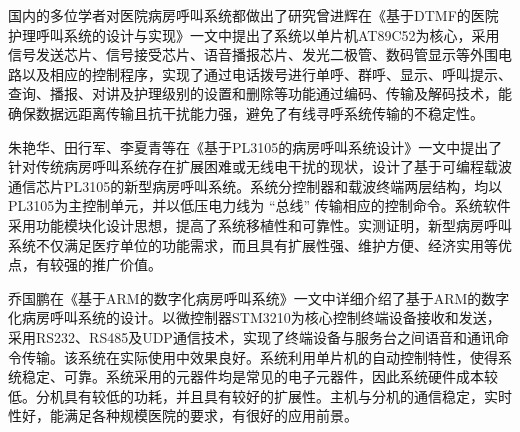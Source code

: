 国{\cf}内的{\cf}多位{\cf}学者{\cf}对医{\cf}院病{\cf}房呼{\cf}叫系{\cf}统都{\cf}做出{\cf}了研{\cf}究曾{\cf}进辉{\cf}在《{\cf}基于{\cf}DT{\cf}MF{\cf}的医{\cf}院护{\cf}理呼{\cf}叫系{\cf}统的{\cf}设计{\cf}与实{\cf}现》{\cf}一文{\cf}中提{\cf}出了{\cf}系统{\cf}以单{\cf}片机{\cf}AT{\cf}89{\cf}C5{\cf}2为{\cf}核心{\cf}，采{\cf}用信{\cf}号发{\cf}送芯{\cf}片、{\cf}信号{\cf}接受{\cf}芯片{\cf}、语{\cf}音播{\cf}报芯{\cf}片、{\cf}发光{\cf}二极{\cf}管、{\cf}数码{\cf}管显{\cf}示等{\cf}外围{\cf}电路{\cf}以及{\cf}相应{\cf}的控{\cf}制程{\cf}序，{\cf}实现{\cf}了通{\cf}过电{\cf}话拨{\cf}号进{\cf}行单{\cf}呼、{\cf}群呼{\cf}、显{\cf}示、{\cf}呼叫{\cf}提示{\cf}、查{\cf}询、{\cf}播报{\cf}、对{\cf}讲及{\cf}护理{\cf}级别{\cf}的设{\cf}置和{\cf}删除{\cf}等功{\cf}能通{\cf}过编{\cf}码、{\cf}传输{\cf}及解{\cf}码技{\cf}术，{\cf}能确{\cf}保数{\cf}据远{\cf}距离{\cf}传输{\cf}且抗{\cf}干扰{\cf}能力{\cf}强，{\cf}避免{\cf}了有{\cf}线寻{\cf}呼系{\cf}统传{\cf}输的{\cf}不稳{\cf}定性{\cf}。

朱{\cf}艳华{\cf}、田{\cf}行军{\cf}、李{\cf}夏青{\cf}等在{\cf}《基{\cf}于P{\cf}L3{\cf}10{\cf}5的{\cf}病房{\cf}呼叫{\cf}系统{\cf}设计{\cf}》一{\cf}文中{\cf}提出{\cf}了针{\cf}对传{\cf}统病{\cf}房呼{\cf}叫系{\cf}统存{\cf}在扩{\cf}展困{\cf}难或{\cf}无线{\cf}电干{\cf}扰的{\cf}现状{\cf}，设{\cf}计了{\cf}基于{\cf}可编{\cf}程载{\cf}波通{\cf}信芯{\cf}片P{\cf}L3{\cf}10{\cf}5的{\cf}新型{\cf}病房{\cf}呼叫{\cf}系统{\cf}。系{\cf}统分{\cf}控制{\cf}器和{\cf}载波{\cf}终端{\cf}两层{\cf}结构{\cf}，均{\cf}以P{\cf}L3{\cf}10{\cf}5为{\cf}主控{\cf}制单{\cf}元，{\cf}并以{\cf}低压{\cf}电力{\cf}线为{\cf} “总{\cf}线” {\cf}传输{\cf}相应{\cf}的控{\cf}制命{\cf}令。{\cf}系统{\cf}软件{\cf}采用{\cf}功能{\cf}模块{\cf}化设{\cf}计思{\cf}想，{\cf}提高{\cf}了系{\cf}统移{\cf}植性{\cf}和可{\cf}靠性{\cf}。实{\cf}测证{\cf}明，{\cf}新型{\cf}病房{\cf}呼叫{\cf}系统{\cf}不仅{\cf}满足{\cf}医疗{\cf}单位{\cf}的功{\cf}能需{\cf}求，{\cf}而且{\cf}具有{\cf}扩展{\cf}性强{\cf}、维{\cf}护方{\cf}便、{\cf}经济{\cf}实用{\cf}等优{\cf}点，{\cf}有较{\cf}强的{\cf}推广{\cf}价值{\cf}。

乔{\cf}国鹏{\cf}在《{\cf}基于{\cf}AR{\cf}M的{\cf}数字{\cf}化病{\cf}房呼{\cf}叫系{\cf}统》{\cf}一文{\cf}中详{\cf}细介{\cf}绍了{\cf}基于{\cf}AR{\cf}M的{\cf}数字{\cf}化病{\cf}房呼{\cf}叫系{\cf}统的{\cf}设计{\cf}。以{\cf}微控{\cf}制器{\cf}ST{\cf}M3{\cf}21{\cf}0为{\cf}核心{\cf}控制{\cf}终端{\cf}设备{\cf}接收{\cf}和发{\cf}送，{\cf}采用{\cf}RS{\cf}23{\cf}2、{\cf}RS{\cf}48{\cf}5及{\cf}UD{\cf}P通{\cf}信技{\cf}术，{\cf}实现{\cf}了终{\cf}端设{\cf}备与{\cf}服务{\cf}台之{\cf}间语{\cf}音和{\cf}通讯{\cf}命令{\cf}传输{\cf}。该{\cf}系统{\cf}在实{\cf}际使{\cf}用中{\cf}效果{\cf}良好{\cf}。系{\cf}统利{\cf}用单{\cf}片机{\cf}的自{\cf}动控{\cf}制特{\cf}性，{\cf}使得{\cf}系统{\cf}稳定{\cf}、可{\cf}靠。{\cf}系统{\cf}采用{\cf}的元{\cf}器件{\cf}均是{\cf}常见{\cf}的电{\cf}子元{\cf}器件{\cf}，因{\cf}此系{\cf}统硬{\cf}件成{\cf}本较{\cf}低。{\cf}分机{\cf}具有{\cf}较低{\cf}的功{\cf}耗，{\cf}并且{\cf}具有{\cf}较好{\cf}的扩{\cf}展性{\cf}。主{\cf}机与{\cf}分机{\cf}的通{\cf}信稳{\cf}定，{\cf}实时{\cf}性好{\cf}，能{\cf}满足{\cf}各种{\cf}规模{\cf}医院{\cf}的要{\cf}求，{\cf}有很{\cf}好的{\cf}应用{\cf}前景。

